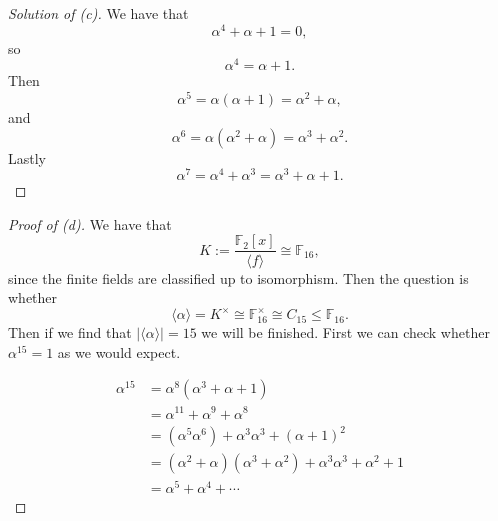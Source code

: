 \begin{proof}[Solution of (c)]
    We have that 
    \[
        \alpha^4 + \alpha + 1 = 0, 
    \]
    so 
    \[
        \alpha^4 = \alpha + 1.
    \]
    Then 
    \[
        \alpha^5 = \alpha(\alpha + 1) = \alpha^2 + \alpha,
    \]
    and 
    \[
        \alpha^6 = \alpha(\alpha^2 + \alpha) = \alpha^3 + \alpha^2. 
    \]
    Lastly 
    \[
        \alpha^7 = \alpha^4 + \alpha^3 
        = \alpha^3 + \alpha + 1.
    \]
\end{proof}

\begin{proof}[Proof of (d)]
    We have that 
    \[
        K := \frac{\mathbb F_2[x]}{\langle f \rangle} 
        \cong \mathbb F_{16},  
    \]
    since the finite fields are classified up to isomorphism. 
    Then the question is whether 
    \[
        \langle \alpha \rangle 
        = K^\times \cong \mathbb F_{16}^\times \cong 
        C_{15} \leq \mathbb F_{16}.
    \]
    Then if we find that $|\langle \alpha \rangle| = 15$ we 
    will be finished. 
    First we can check whether 
    $\alpha^{15} = 1$ as we would expect. 

    \begin{align*}
        \alpha^{15} 
        &= \alpha^8(\alpha^3 + \alpha + 1) \\ 
        &= \alpha^{11} + \alpha^9 + \alpha^8 \\ 
        &= (\alpha^5 \alpha^6) + \alpha^3\alpha^3 + (\alpha + 1)^2 \\ 
        &= (\alpha^2 + \alpha)(\alpha^3 + \alpha^2) + 
        \alpha^3 \alpha^3 + \alpha^2 + 1 \\ 
        &= \alpha^5 + \alpha^4 + \cdots 
    \end{align*}
\end{proof}

